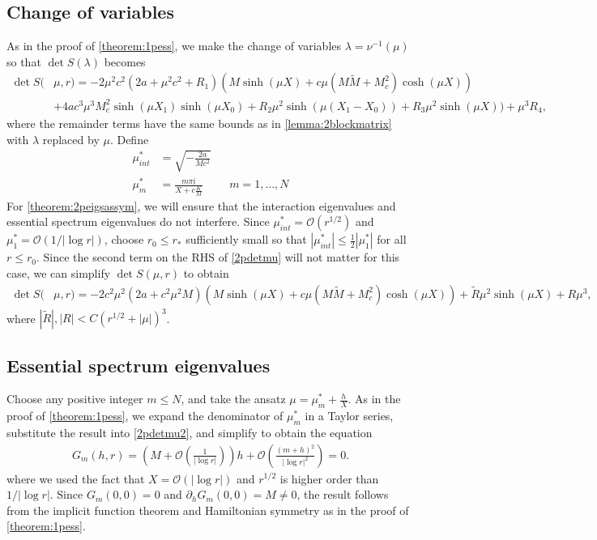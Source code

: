 \documentclass[10pt,reqno]{amsart}
\theoremstyle{plain}
\theoremstyle{definition}
\theoremstyle{remark}
\numberwithin{theorem}{section}
\numberwithin{equation}{section}
\begin{document}
\subsection{Change of variables}

As in the proof of \cref{theorem:1pess}, we make the change of variables $\lambda = \nu^{-1}(\mu)$ so that $\det S(\lambda)$ becomes 
\begin{equation}\label{2pdetmu}
\begin{aligned}
\det S(&\mu, r) = -2 \mu^2 c^2 (2a + \mu^2 c^2 + R_1) \left( M \sinh(\mu X) + c \mu (M \tilde{M} + M_c^2 ) \cosh(\mu X) \right) \\
&+4 a c^3 \mu^3 M_c^2 \sinh(\mu X_1)\sinh(\mu X_0) 
+ R_2 \mu^2 \sinh(\mu(X_1 - X_0)) + R_3 \mu^2 \sinh(\mu X)) + \mu^3 R_4,
\end{aligned}
\end{equation}
where the remainder terms have the same bounds as in \cref{lemma:2blockmatrix} with $\lambda$ replaced by $\mu$. Define
\begin{align}
\mu^*_{int} &= \sqrt{-\frac{2 a}{M c^2}} \label{defmustarint} \\
\mu^*_m &= \frac{m \pi i}{X + c \frac{K}{M}}  && m = 1, \dots, N \label{defmustaress}
\end{align}
For \cref{theorem:2peigsassym}, we will ensure that the interaction eigenvalues and essential spectrum eigenvalues do not interfere. Since $\mu^*_{int} = \mathcal{O}(r^{1/2})$ and $\mu^*_1 = \mathcal{O}(1/|\log r|)$, choose $r_0 \leq r_*$ sufficiently small so that $|\mu^*_{int}| \leq \frac{1}{2} |\mu^*_1|$ for all $r \leq r_0$. Since the second term on the RHS of \cref{2pdetmu} will not matter for this case, we can simplify $\det S(\mu, r)$ to obtain 
\begin{equation}\label{2pdetmu2}
\begin{aligned}
\det S(&\mu, r) = -2 c^2 \mu^2 (2a + c^2 \mu^2 M) \left( M \sinh(\mu X) + c \mu (M \tilde{M} + M_c^2 ) \cosh(\mu X) \right) + \tilde{R} \mu^2 \sinh(\mu X) + R \mu^3,
\end{aligned}
\end{equation}
where $|\tilde{R}|, |R| < C(r^{1/2} + |\mu|)^3$. 

\subsection{Essential spectrum eigenvalues}

Choose any positive integer $m \leq N$, and take the ansatz $\mu = \mu^*_m + \frac{h}{X}$. As in the proof of \cref{theorem:1pess}, we expand the denominator of $\mu^*_m$ in a Taylor series, substitute the result into \cref{2pdetmu2}, and simplify to obtain the equation
\begin{align*}
G_m(h, r) = \left( M + \mathcal{O}\left( \frac{1}{|\log r|} \right)\right) h + \mathcal{O}\left( \frac{(m+h)^2}{|\log r|^2} \right) = 0.
\end{align*}
where we used the fact that $X = \mathcal{O}(|\log r|)$ and $r^{1/2}$ is higher order than $1/|\log r|$. Since $G_m(0,0) = 0$ and $\partial_h G_m(0,0) = M \neq 0$, the result follows from the implicit function theorem and Hamiltonian symmetry as in the proof of \cref{theorem:1pess}.
\end{document}
